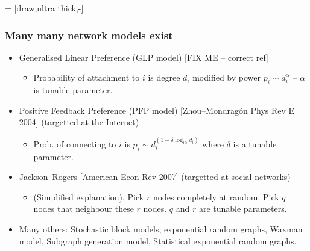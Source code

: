 \documentclass[svgnames]{beamer}
\begin{document}
 = [draw,ultra thick,-]
{
\frametitle{Many many network models exist}

\begin{itemize}
\item Generalised Linear Preference (GLP model) [FIX ME -- correct ref] 
\begin{itemize}
\item Probability of attachment to $i$ is degree $d_i$ modified by power $p_i \sim  d_i^ {\alpha}$ -- $\alpha$ is tunable parameter.
\end{itemize}
\item Positive Feedback Preference (PFP model) [Zhou--Mondrag\'on Phys Rev E 2004] (targetted at the Internet)
\begin{itemize}
\item Prob. of connecting to $i$ is 
$p_i \sim 
d_i^ {(1 - \delta \log_{10} d_i)}$ where
$\delta$ is a tunable parameter.
\end{itemize}
\item Jackson--Rogers [American Econ Rev 2007] (targetted at social networks)
\begin{itemize}
\item (Simplified explanation).  Pick $r$ nodes completely at random.  Pick $q$ nodes that neighbour these $r$ nodes.  $q$ and $r$ are tunable parameters.
\end{itemize}
\item Many others: Stochastic block models, exponential random graphs, Waxman model, Subgraph generation model, Statistical exponential random graphs.
\end{itemize}
}
\end{document}
